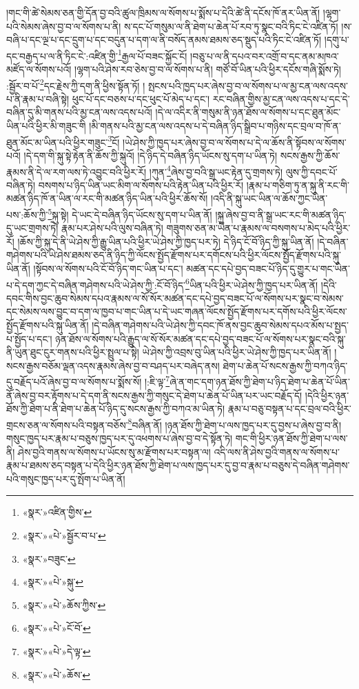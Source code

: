 །གང་གི་ཚེ་སེམས་ཅན་གྱི་དོན་བྱ་བའི་ཚུལ་ཁྲིམས་ལ་སོགས་པ་སྨོས་པ་དེའི་ཚེ་ནི་དངོས་ཁོ་ནར་ཡིན་ནོ། །ལྷག་པའི་སེམས་ཞེས་བྱ་བ་ལ་སོགས་པ་ནི། ས་དང་པོ་གསུམ་ལ་ནི་ཐེག་པ་ཆེན་པོ་རབ་ཏུ་སྣང་བའི་ཏིང་ངེ་འཛིན་ཏོ། །ས་བཞི་པ་དང་ལྔ་པ་དང་དྲུག་པ་དང་བདུན་པ་དག་ལ་ནི་བསོད་ནམས་ཐམས་ཅད་སྡུད་པའི་ཏིང་ངེ་འཛིན་ཏོ། །དགུ་པ་དང་བརྒྱད་པ་ལ་ནི་ཏིང་ངེ་:འཛིན་གྱི་\footnote{«སྣར་»འཛིན་གྱིས་}རྒྱལ་པོ་བཟང་སྐྱོང་ངོ། །བཅུ་པ་ལ་ནི་དཔའ་བར་འགྲོ་བ་དང་ནམ་མཁའ་མཛོད་ལ་སོགས་པའོ། །ལྷག་པའི་ཤེས་རབ་ཅེས་བྱ་བ་ལ་སོགས་པ་ནི། གཙོ་བོ་ཡིན་པའི་ཕྱིར་དངོས་གཞི་སྨོས་ཏེ། :སྦྱོར་བ་པོ་\footnote{«སྣར་»«པེ་»སྦྱོར་བ་པ་}དང་རྗེས་ཀྱི་དག་ནི་ཕྱིས་སྟོན་ཏོ། །
སྤངས་པའི་ཁྱད་པར་ཞེས་བྱ་བ་ལ་སོགས་པ་ལ་མྱ་ངན་ལས་འདས་པ་ནི་རྣམ་པ་བཞི་སྟེ། ཕུང་པོ་དང་བཅས་པ་དང་ཕུང་པོ་མེད་པ་དང་། རང་བཞིན་གྱིས་མྱ་ངན་ལས་འདས་པ་དང་དེ་བཞིན་དུ་མི་གནས་པའི་མྱ་ངན་ལས་འདས་པའོ། །དེ་ལ་འདིར་ནི་གསུམ་ནི་ཉན་ཐོས་ལ་སོགས་པ་དང་ཐུན་མོང་ཡིན་པའི་ཕྱིར་མི་གཟུང་གི །མི་གནས་པའི་མྱ་ངན་ལས་འདས་པ་དེ་བཞིན་ཉིད་སྒྲིབ་པ་གཉིས་དང་བྲལ་བ་ཁོ་ན་ཐུན་མོང་མ་ཡིན་པའི་ཕྱིར་གཟུང་\footnote{«སྣར་»བཟུང་}ངོ། །ཡེ་ཤེས་ཀྱི་ཁྱད་པར་ཞེས་བྱ་བ་ལ་སོགས་པ་དེ་ལ་ཆོས་ནི་སྟོབས་ལ་སོགས་པའོ། །དེ་དག་གི་སྐུ་སྟེ་རྟེན་ནི་ཆོས་ཀྱི་སྐུའོ། །དེ་ཉིད་དེ་བཞིན་ཉིད་ཡོངས་སུ་དག་པ་ཡིན་ཏེ། སངས་རྒྱས་ཀྱི་ཆོས་རྣམས་ནི་དེ་ལ་རག་ལས་ཏེ་འབྱུང་བའི་ཕྱིར་རོ། །ཀུན་\footnote{«སྣར་»«པེ་»སྐུ་}ཞེས་བྱ་བའི་སྒྲ་ཡང་རྟེན་དུ་གྲགས་ཏེ། ལུས་ཀྱི་དབང་པོ་བཞིན་ཏེ། བསགས་པ་ཉིད་ཡིན་ཡང་མིག་ལ་སོགས་པའི་རྟེན་ཡིན་པའི་ཕྱིར་རོ། །རྣམ་པ་གཅིག་ཏུ་ན་སྐུ་ནི་རང་གི་མཚན་ཉིད་ཁོ་ན་ཡིན་ལ་རང་གི་མཚན་ཉིད་ཡིན་པའི་ཕྱིར་ཆོས་སོ། །འདི་ནི་སྐུ་ཡང་ཡིན་ལ་ཆོས་ཀྱང་ཡིན་པས་:ཆོས་ཀྱི་\footnote{«སྣར་»«པེ་»ཆོས་ཀྱིས་}སྐུ་སྟེ། དེ་ཡང་དེ་བཞིན་ཉིད་ཡོངས་སུ་དག་པ་ཡིན་ནོ། །སྐུ་ཞེས་བྱ་བ་ནི་སྒྲ་ཡང་རང་གི་མཚན་ཉིད་དུ་ཡང་གྲགས་ཏེ། རྣམ་པར་ཤེས་པའི་ལུས་བཞིན་ཏེ། གཟུགས་ཅན་མ་ཡིན་པ་རྣམས་ལ་བསགས་པ་མེད་པའི་ཕྱིར་རོ། །ཆོས་ཀྱི་སྐུ་དེ་ནི་ཡེ་ཤེས་ཀྱི་རྒྱུ་ཡིན་པའི་ཕྱིར་ཡེ་ཤེས་ཀྱི་ཁྱད་པར་ཏེ། དེ་ཉིད་ངོ་བོ་ཉིད་ཀྱི་སྐུ་ཡིན་ནོ། །དེ་བཞིན་གཤེགས་པའི་ཡེ་ཤེས་ཐམས་ཅད་ནི་ཉིད་ཀྱི་ལོངས་སྤྱོད་རྫོགས་པར་དགོངས་པའི་ཕྱིར་ལོངས་སྤྱོད་རྫོགས་པའི་སྐུ་ཡིན་ནོ། །སྟོབས་ལ་སོགས་པའི་ངོ་བོ་ཉིད་གང་ཡིན་པ་དང་། མཚན་དང་དཔེ་བྱད་བཟང་པོ་ཉིད་དུ་གྱུར་པ་གང་ཡིན་པ་དེ་དག་ཀྱང་དེ་བཞིན་གཤེགས་པའི་ཡེ་ཤེས་ཀྱི་:ངོ་བོ་ཉིད་\footnote{«སྣར་»«པེ་»ངོ་བོ་}ཡིན་པའི་ཕྱིར་ཡེ་ཤེས་ཀྱི་ཁྱད་པར་ཡིན་ནོ། །དེའི་དབང་གིས་བྱང་ཆུབ་སེམས་དཔའ་རྣམས་ལ་སོ་སོར་མཚན་དང་དཔེ་བྱད་བཟང་པོ་ལ་སོགས་པར་སྣང་བ་སེམས་དང་སེམས་ལས་བྱུང་བ་དག་ལ་ཁྱབ་པ་གང་ཡིན་པ་དེ་ཡང་གཞན་ལོངས་སྤྱོད་རྫོགས་པར་དགོས་པའི་ཕྱིར་ལོངས་སྤྱོད་རྫོགས་པའི་སྐུ་ཡིན་ནོ། །དེ་བཞིན་གཤེགས་པའི་ཡེ་ཤེས་ཀྱི་དབང་ཁོ་ནས་བྱང་ཆུབ་སེམས་དཔའ་མོས་པ་སྤྱད་པ་སྤྱོད་པ་དང་། ཉན་ཐོས་ལ་སོགས་པའི་རྒྱུད་ལ་སོ་སོར་མཚན་དང་དཔེ་བྱད་བཟང་པོ་ལ་སོགས་པར་སྣང་བའི་སྐུ་ནི་ཡུན་ཐུང་ངུར་གནས་པའི་ཕྱིར་སྤྲུལ་པ་སྟེ། ཡེ་ཤེས་ཀྱི་འབྲས་བུ་ཡིན་པའི་ཕྱིར་ཡེ་ཤེས་ཀྱི་ཁྱད་པར་ཡིན་ནོ། །སངས་རྒྱས་བཅོམ་ལྡན་འདས་རྣམས་ཞེས་བྱ་བ་བཤད་པར་བཞེད་ནས། ཐེག་པ་ཆེན་པོ་སངས་རྒྱས་ཀྱི་བཀའ་ཉིད་དུ་བརྗོད་པའོ་ཞེས་བྱ་བ་ལ་སོགས་པ་སྨོས་སོ། །:ཇི་ལྟ་\footnote{«སྣར་»«པེ་»དེ་ལྟ་}ཞེ་ན་གང་དག་ཉན་ཐོས་ཀྱི་ཐེག་པ་ཉིད་ཐེག་པ་ཆེན་པོ་ཡིན་ནོ་ཞེས་བྱ་བར་རྟོགས་པ་དེ་དག་ནི་སངས་རྒྱས་ཀྱི་གསུང་དེ་ཐེག་པ་ཆེན་པོ་ཡིན་པར་ཡང་བརྗོད་དོ། །དེའི་ཕྱིར་ཉན་ཐོས་ཀྱི་ཐེག་པ་ནི་ཐེག་པ་ཆེན་པོ་ཉིད་དུ་སངས་རྒྱས་ཀྱི་བཀའ་མ་ཡིན་ཏེ། རྣམ་པ་བཅུ་བསྟན་པ་དང་བྲལ་བའི་ཕྱིར་གྲངས་ཅན་ལ་སོགས་པའི་བསྟན་བཅོས་\footnote{«སྣར་»«པེ་»ཆོས་}བཞིན་ནོ། །ཉན་ཐོས་ཀྱི་ཐེག་པ་ལས་ཁྱད་པར་དུ་བྱས་པ་ཞེས་བྱ་བ་ནི། གསུང་ཁྱད་པར་རྣམ་པ་བཅུས་ཁྱད་པར་དུ་འཕགས་པ་ཞེས་བྱ་བ་དེ་སྟོན་ཏེ། གང་གི་ཕྱིར་ཉན་ཐོས་ཀྱི་ཐེག་པ་ལས་ནི། ཤེས་བྱའི་གནས་ལ་སོགས་པ་ཡོངས་སུ་མ་རྫོགས་པར་བསྟན་ལ། འདི་ལས་ནི་ཤེས་བྱའི་གནས་ལ་སོགས་པ་རྣམ་པ་ཐམས་ཅད་བསྟན་པ་དེའི་ཕྱིར་ཉན་ཐོས་ཀྱི་ཐེག་པ་ལས་ཁྱད་པར་དུ་བྱ་བ་རྣམ་པ་བཅུས་དེ་བཞིན་གཤེགས་པའི་གསུང་ཁྱད་པར་དུ་སྤོག་པ་ཡིན་ནོ། 